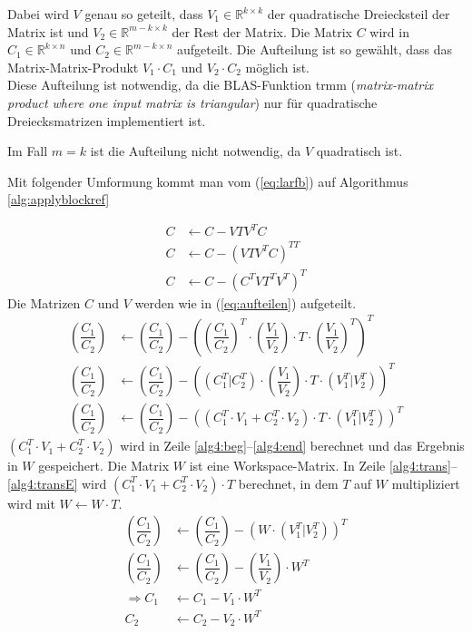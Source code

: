 Dabei wird $V$ genau so geteilt, dass $V_1 \in \mathbb{R}^{k\times k}$ der quadratische Dreiecksteil der Matrix ist und $V_2 \in \mathbb{R}^{m-k\times k}$ der Rest der Matrix. Die Matrix $C$ wird in $C_1 \in \mathbb{R}^{k \times n}$ und $C_2 \in \mathbb{R}^{m-k \times n}$  aufgeteilt. Die Aufteilung ist so gewählt, dass das Matrix-Matrix-Produkt $V_1 \cdot C_1$ und $V_2 \cdot C_2$ möglich ist.\\
Diese Aufteilung ist notwendig, da die BLAS-Funktion trmm (\textit{matrix-matrix product where one input matrix is triangular}) nur für quadratische Dreiecksmatrizen implementiert ist.

Im Fall $ m = k $ ist die Aufteilung nicht notwendig, da $ V $ quadratisch ist.

Mit folgender Umformung kommt man vom (\ref{eq:larfb}) auf Algorithmus \ref{alg:applyblockref}

\begin{align*}
	C &\leftarrow  C - V T V^T C \\
	C &\leftarrow C - \left(V T V^T C\right)^{TT} 	\\
	C &\leftarrow  C - \left(C^T  V  T^T  V^T\right)^T
\end{align*}
Die Matrizen $C$ und $V$ werden wie in (\ref{eq:aufteilen}) aufgeteilt.
\begin{align*}
	\left(\dfrac{C_1}{C_2}\right) &\leftarrow  \left(\dfrac{C_1}{C_2}\right) -  \left( \left(\dfrac{C_1}{C_2}\right)^T \cdot \left(\dfrac{V_1}{V_2}\right) \cdot T \cdot \left(\dfrac{V_1}{V_2}\right)^T \right)^T \\
	\left(\dfrac{C_1}{C_2}\right) &\leftarrow  \left(\dfrac{C_1}{C_2}\right) - \left( \left(C_1^T|C_2^T\right)	\cdot \left(\dfrac{V_1}{V_2}\right) \cdot T \cdot \left(V_1^T|V_2^T\right) \right)^T \\
	\left(\dfrac{C_1}{C_2}\right) &\leftarrow  \left(\dfrac{C_1}{C_2}\right) - \left( \left( C_1^T \cdot V_1 + C_2^T \cdot V_2 \right) \cdot T \cdot \left(V_1^T|V_2^T\right) \right)^T 
\end{align*}
$ \left( C_1^T \cdot V_1 + C_2^T \cdot V_2 \right) $ wird in Zeile \ref{alg4:beg}--\ref{alg4:end} berechnet und das Ergebnis in $W$ gespeichert. Die Matrix $W$ ist eine Workspace-Matrix. In Zeile \ref{alg4:trans}--\ref{alg4:transE} wird  $ \left( C_1^T \cdot V_1 + C_2^T \cdot V_2 \right) \cdot T$ berechnet, in dem $T$ auf $W$ multipliziert wird mit $W \leftarrow W \cdot T$. 
\begin{align*}
	\left(\dfrac{C_1}{C_2}\right) &\leftarrow  \left(\dfrac{C_1}{C_2}\right) - \left( W \cdot \left(V_1^T|V_2^T\right) \right)^T \\
	\left(\dfrac{C_1}{C_2}\right) &\leftarrow  \left(\dfrac{C_1}{C_2}\right) - \left(\dfrac{V_1}{V_2}\right) \cdot W^T 	\\
	\Longrightarrow C_1 &\leftarrow C_1 - V_1 \cdot W^T\\
	C_2 &\leftarrow C_2 - V_2 \cdot W^T	
\end{align*}


